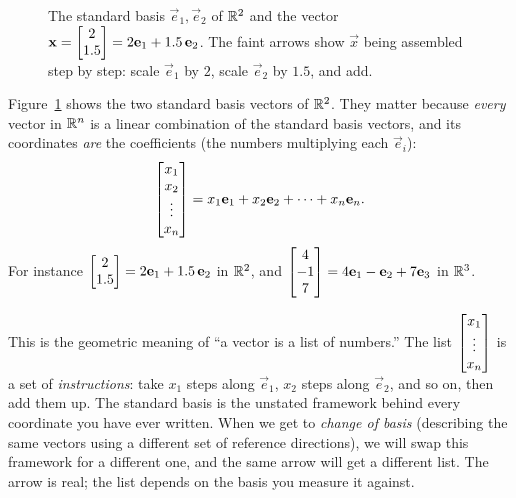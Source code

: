 \begin{figure}[H]
\centering
{}
\caption{The standard basis $\vec{e}_1,\vec{e}_2$ of $\mathbb{R}^2$ and the vector
$\mathbf{x}=\begin{bmatrix}2\\1.5\end{bmatrix}=2\mathbf{e}_1+1.5\,\mathbf{e}_2$. The faint arrows show $\vec{x}$ being
assembled step by step: scale $\vec{e}_1$ by $2$, scale $\vec{e}_2$ by $1.5$, and add.}
\label{ch02:fig-basis}
\end{figure}

Figure~\ref{ch02:fig-basis} shows the two standard basis vectors of $\mathbb{R}^2$. They matter
because \emph{every} vector in $\mathbb{R}^n$ is a linear combination of the standard basis
vectors, and its coordinates \emph{are} the coefficients (the numbers multiplying
each $\vec{e}_i$):
\[
  \begin{bmatrix}x_1\\x_2\\\vdots\\x_n\end{bmatrix}
  = x_1\mathbf{e}_1 + x_2\mathbf{e}_2 + \cdots + x_n\mathbf{e}_n.
\]
For instance $\begin{bmatrix}2\\1.5\end{bmatrix} = 2\mathbf{e}_1 + 1.5\,\mathbf{e}_2$ in $\mathbb{R}^2$, and
$\begin{bmatrix}4\\-1\\7\end{bmatrix} = 4\mathbf{e}_1 - \mathbf{e}_2 + 7\mathbf{e}_3$ in $\mathbb{R}^3$.

\begin{focusbox}
This is the geometric meaning of ``a vector is a list of numbers.'' The list
$\begin{bmatrix}x_1\\\vdots\\x_n\end{bmatrix}$ is a set of \emph{instructions}: take $x_1$ steps along
$\vec{e}_1$, $x_2$ steps along $\vec{e}_2$, and so on, then add them up. The standard basis
is the unstated framework behind every coordinate you have ever written. When we get to
\emph{change of basis} (describing the same vectors using a different set of reference
directions), we will swap this framework for a different one, and the same
arrow will get a different list. The arrow is real; the list depends on the basis you
measure it against.
\end{focusbox}

